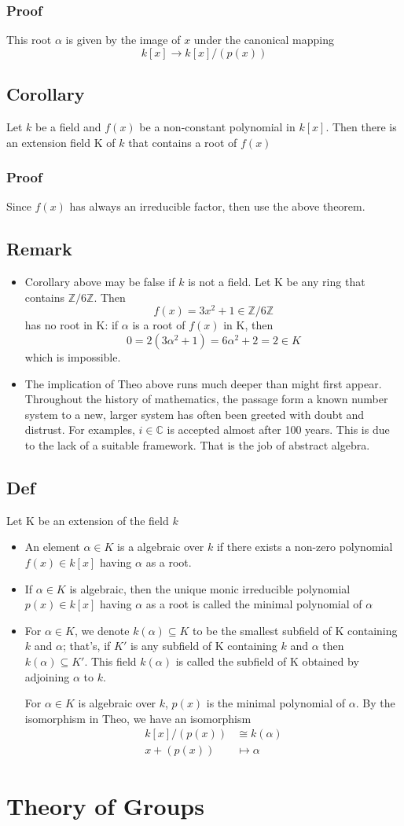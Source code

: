 \documentclass{book}
\begin{document}
\subsection*{Proof}
This root $\alpha$ is given by the image of $x$ under the canonical mapping $$k[x]\to k[x]/(p(x))$$
\section{Corollary}
Let $k$ be a field and $f(x)$ be a non-constant polynomial in $k[x]$. Then there is an extension field K of $k$ that contains a root of $f(x)$
\subsection*{Proof}
Since $f(x)$ has always an irreducible factor, then use the above theorem.
\section{Remark}
 \begin{itemize}
	\item Corollary above may be false if $k$ is not a field. Let K be any ring that contains $\mathbb Z/6\mathbb Z$. Then $$f(x)=3x^2+1\in \mathbb Z/6\mathbb Z$$ has no root in K: if $\alpha$ is a root of $f(x)$ in K, then $$0=2(3\alpha^2+1)=6\alpha^2+2=2\in K$$which is impossible.
	\item The implication of Theo above runs much deeper than might first appear. Throughout the history of mathematics, the passage form a known number system to a new, larger system has often been greeted with doubt and distrust. For examples, $i\in \mathbb C$ is accepted almost after 100 years. This is due to the lack of a suitable framework. That is the job of abstract algebra.
 \end{itemize}
\section{Def}
Let K be an extension of the field $k$
\begin{itemize}
	\item An element $\alpha\in K$ is a algebraic over $k$ if there exists a non-zero polynomial $f(x)\in k[x]$ having $\alpha$ as a root.
	\item If $\alpha\in K$ is algebraic, then the unique monic irreducible polynomial $p(x)\in k[x]$ having $\alpha$ as a root is called the minimal polynomial of $\alpha$
	\item For $\alpha\in K$, we denote $k(\alpha)\subseteq K$ to be the smallest subfield of K containing $k$ and $\alpha$; that's, if $K'$ is any subfield of K containing $k$ and $\alpha$ then $k(\alpha)\subseteq K'$. This field $k(\alpha)$ is called the subfield of K obtained by adjoining $\alpha$ to $k$.
	
	For $\alpha\in K$ is algebraic over $k$, $p(x)$ is the minimal polynomial of $\alpha$. By the isomorphism in Theo, we have an isomorphism$$\begin{aligned}
		k[x]/(p(x))&\cong k(\alpha)\\ x+(p(x))&\mapsto \alpha
	\end{aligned}$$
\end{itemize}
\chapter{Theory of Groups}
\end{document}
